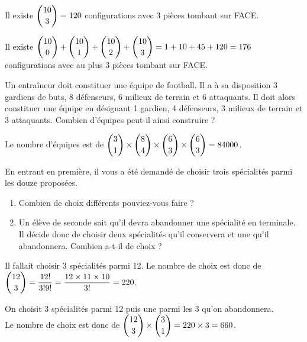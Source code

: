 \documentclass[11pt,fleqn, openany]{book} %
\begin{document}
\begin{solution}Il existe $\dbinom{10}{3}=120$ configurations avec 3 pièces tombant sur FACE. 

Il existe $\dbinom{10}{0}+\dbinom{10}{1}+\dbinom{10}{2}+\dbinom{10}{3}=1+10+45+120=176$ configurations avec au plus 3 pièces tombant sur FACE.\end{solution}





\begin{exercise}[topic=comb03]Un entraîneur doit constituer une équipe de football. Il a à sa disposition 3 gardiens de buts, 8 défenseurs, 6 milieux de terrain et 6 attaquants. Il doit alors constituer une équipe en désignant 1 gardien, 4 défenseurs, 3 milieux de terrain et 3 attaquants. Combien d'équipes peut-il ainsi construire ?\end{exercise}

\begin{solution}Le nombre d'équipes est de $\dbinom{3}{1} \times \dbinom{8}{4} \times \dbinom{6}{3} \times \dbinom{6}{3} = 84000$.\end{solution}




\begin{exercise}[topic=comb03]En entrant en première, il vous a été demandé de choisir trois spécialités parmi les douze proposées.
\begin{enumerate}
\item Combien de choix différents pouviez-vous faire ?
\item Un élève de seconde sait qu'il devra abandonner une spécialité en terminale. Il décide donc de choisir deux spécialités qu'il conservera et une qu'il abandonnera. Combien a-t-il de choix ?
\end{enumerate}\end{exercise}

\begin{solution}Il fallait choisir 3 spécialités parmi 12. Le nombre de choix est donc de $\dbinom{12}{3}=\dfrac{12!}{3!9!}=\dfrac{12 \times 11 \times 10}{3!}=220$.

On choisit 3 spécialités parmi 12 puis une parmi les 3 qu'on abandonnera. \\Le nombre de choix est donc de $\dbinom{12}{3} \times \dbinom{3}{1}=220 \times 3 = 660$.\end{solution}

\end{document}
